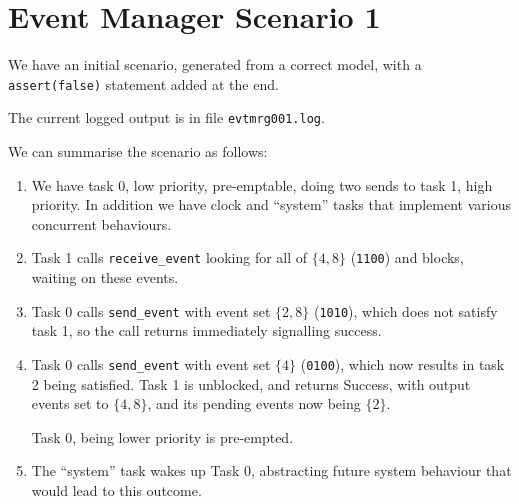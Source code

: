 \chapter{Event Manager Scenario 1}

We have an initial scenario, generated from a correct model,
with a \texttt{assert(false)} statement added at the end.

The current logged output is in file \texttt{evtmrg001.log}.

We can summarise the scenario as follows:
\begin{enumerate}
  \item
    We have task 0, low priority, pre-emptable,
    doing two sends to task 1, high priority.
    In addition we have clock and ``system'' tasks
    that implement various concurrent behaviours.
  \item
    Task 1 calls \texttt{receive_event} looking for all of $\{4,8\}$ (\texttt{1100})
    and blocks, waiting on these events.
  \item
    Task 0 calls \texttt{send_event} with event set $\{2,8\}$ (\texttt{1010}),
    which does not satisfy task 1, so the call returns
    immediately signalling success.
  \item
    Task 0 calls \texttt{send_event} with event set $\{4\}$ (\texttt{0100}),
    which now results in task 2 being satisfied.
    Task 1 is unblocked,
    and returns Success, with output events set to $\{4,8\}$,
    and its pending events now being $\{2\}$.

    Task 0, being lower priority is pre-empted.
  \item
    The ``system'' task wakes up  Task 0,
    abstracting future system behaviour that would lead to this outcome.
\end{enumerate}

